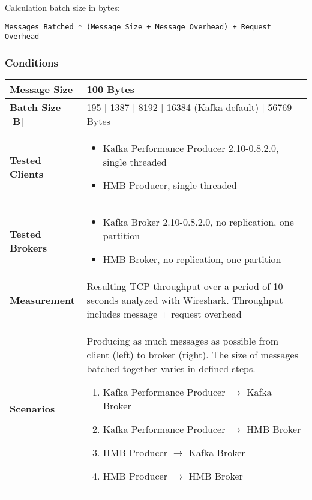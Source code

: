 Calculation batch size in bytes:
\begin{verbatim}
Messages Batched * (Message Size + Message Overhead) + Request Overhead 
\end{verbatim}

\subsubsection{Conditions}
\begin{table}[H]
\begin{tabular}{|l| p{11.5cm}|} \hline
{\bf Message Size}   & 100 Bytes \\ \hline
{\bf Batch Size [B]} & 195 | 1387 | 8192 | 16384 (Kafka default) | 56769 Bytes \\ \hline
{\bf Tested Clients} &
    \begin{itemize}
        \item Kafka Performance Producer 2.10-0.8.2.0, single threaded
        \item HMB Producer, single threaded
    \end{itemize}\\ \hline
{\bf Tested Brokers} &
    \begin{itemize}
        \item Kafka Broker 2.10-0.8.2.0, no replication, one partition
        \item HMB Broker, no replication, one partition
    \end{itemize}\\ \hline
{\bf Measurement} & Resulting TCP throughput over a period of 10 seconds analyzed with
    Wireshark. Throughput includes message + request overhead\\ \hline
{\bf Scenarios} & Producing as much messages as possible from client (left) to broker (right).
    The size of messages batched together varies in defined steps.
    \begin{enumerate}
        \item Kafka Performance Producer $\rightarrow$ Kafka Broker
        \item Kafka Performance Producer $\rightarrow$ HMB Broker
        \item HMB Producer $\rightarrow$ Kafka Broker
        \item HMB Producer $\rightarrow$ HMB Broker
    \end{enumerate} \\ \hline
\end{tabular}
\end{table}
\newpage

